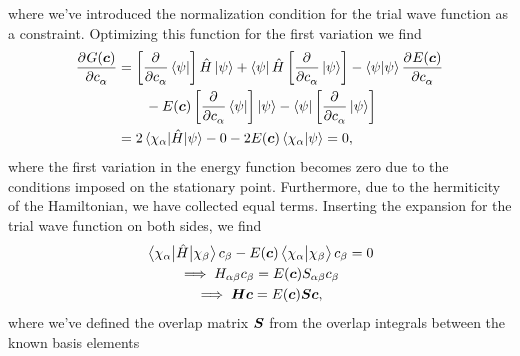             where we've introduced the normalization condition for the trial
            wave function as a constraint.
            Optimizing this function for the first variation we find
            \begin{align}
                \dpd[]{G(\vfg{c})}{c_{\alpha}}
                &=
                \brak{
                    \dpd[]{}{c_{\alpha}}
                    \bra{\psi}
                }\hamil\ket{\psi}
                + \bra{\psi}\hamil
                \brak{
                    \dpd[]{}{c_{\alpha}}
                    \ket{\psi}
                }
                -
                \braket{\psi}{\psi}
                \dpd[]{E(\vfg{c})}{c_{\alpha}}
                \nonumber \\
                &\qquad
                -
                E(\vfg{c})
                \brak{
                    \dpd[]{}{c_{\alpha}}
                    \bra{\psi}
                }\ket{\psi}
                -
                \bra{\psi}
                \brak{
                    \dpd[]{}{c_{\alpha}}
                    \ket{\psi}
                }
                \\
                &=
                2 \mel{\chi_{\alpha}}{\hamil}{\psi}
                - 0
                - 2E(\vfg{c})\braket{\chi_{\alpha}}{\psi}
                = 0,
            \end{align}
            where the first variation in the energy function becomes zero due to
            the conditions imposed on the stationary point.
            Furthermore, due to the hermiticity of the Hamiltonian, we have
            collected equal terms.
            Inserting the expansion for the trial wave function on both sides,
            we find
            \begin{gather}
                \mel{\chi_{\alpha}}{\hat{H}}{\chi_{\beta}} c_{\beta}
                - E(\boldsymbol{c})\braket{\chi_{\alpha}}{\chi_{\beta}} c_{\beta}
                = 0
                \\
                \implies
                H_{\alpha\beta} c_{\beta}
                = E(\boldsymbol{c}) S_{\alpha\beta} c_{\beta}
                \\
                \implies
                \boldsymbol{H} \boldsymbol{c}
                = E(\boldsymbol{c}) \boldsymbol{S} \boldsymbol{c},
                \label{eq:variational-eigenvalue}
            \end{gather}
            where we've defined the overlap matrix $\boldsymbol{S}$ from the
            overlap integrals between the known basis elements
